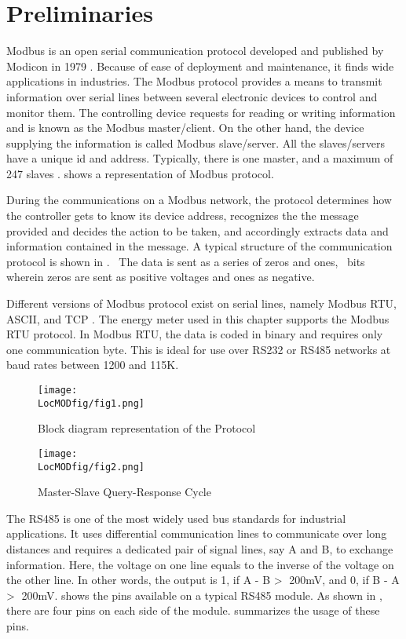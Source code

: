 \section{Preliminaries}
Modbus is an open serial communication protocol developed and
published by Modicon in 1979 \cite{modbus} \cite{modbus-paper}. Because of ease of deployment and maintenance, it finds wide applications in industries. The Modbus protocol provides a means to transmit information over serial lines
between several electronic devices to control and monitor
them. The controlling device requests for reading or writing
information and is known as the Modbus master/client. On the other
hand, the device supplying the information is called
Modbus slave/server. All the slaves/servers have a unique id and
address. Typically, there is one master, and a maximum of 247 slaves \cite{simplymodbus}.  shows a representation of Modbus protocol. 

During the communications on a Modbus network, the protocol determines
how the controller gets to know its device address, recognizes the
the message provided and decides the action to be taken, and accordingly
extracts data and information contained in the message. A typical structure of the communication protocol is shown in .  The data is
sent as a series of zeros and ones, \ie\ bits wherein zeros are sent
as positive voltages and ones as negative. 

Different versions of Modbus protocol exist on serial lines, namely
Modbus RTU, ASCII, and TCP \cite{simplymodbus}. 
The energy meter used in this chapter
supports the Modbus RTU protocol. In Modbus RTU, the data is coded in
binary and requires only one communication byte. This is ideal for use
over RS232 or RS485 networks at baud rates between 1200 and 115K.

\begin{figure}
  \centering
  \texttt{[image: \\LocMODfig/fig1.png]}
  \caption{Block diagram representation of the Protocol}
  \label{mod-block}
\end{figure}


\begin{figure}
  \centering
  \texttt{[image: \\LocMODfig/fig2.png]}
  \caption{Master-Slave Query-Response Cycle}
  \label{mod-master-slave}
\end{figure}

The RS485 is one of the most widely used bus standards for industrial
applications. It uses differential communication lines to communicate
over long distances and requires a dedicated pair of signal lines, say
A and B, to exchange information. Here, the voltage on one line equals
to the inverse of the voltage on the other line. In other words, the
output is 1, if A - B \textgreater $\;$ 200mV, and 0, if B - A \textgreater $\;$
200mV.  shows the pins available
on a typical RS485 module. As shown in , there are four pins on each side 
of the module.  summarizes the usage of these pins. 

